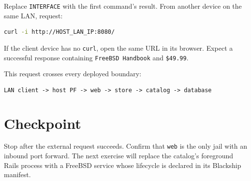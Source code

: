 Replace \texttt{INTERFACE} with the first command's result. From another device
on the same LAN, request:

\begin{lstlisting}[language=sh]
curl -i http://HOST_LAN_IP:8080/
\end{lstlisting}

If the client device has no \texttt{curl}, open the same URL in its browser.
Expect a successful response containing \texttt{FreeBSD Handbook} and
\texttt{\$49.99}.

This request crosses every deployed boundary:

\begin{lstlisting}
LAN client -> host PF -> web -> store -> catalog -> database
\end{lstlisting}

\section{Checkpoint}

Stop after the external request succeeds. Confirm that \texttt{web} is the only
jail with an inbound port forward. The next exercise will replace the catalog's
foreground Rails process with a FreeBSD service whose lifecycle is declared in
its Blackship manifest.
